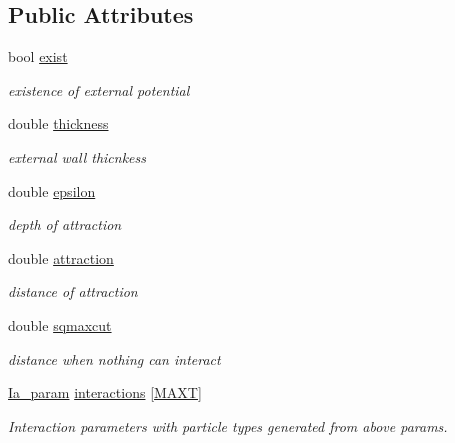 \subsection*{Public Attributes}
\begin{DoxyCompactItemize}
\item 
bool \hyperlink{class_exters_a78d759bd9da50ad5c4669dae9c6172ff}{exist}
\begin{DoxyCompactList}\small\item\em existence of external potential \end{DoxyCompactList}\item 
double \hyperlink{class_exters_a6ac0235fe365f41ca035957b748c9564}{thickness}
\begin{DoxyCompactList}\small\item\em external wall thicnkess \end{DoxyCompactList}\item 
double \hyperlink{class_exters_ac6920553910e27bde3188120889e8381}{epsilon}
\begin{DoxyCompactList}\small\item\em depth of attraction \end{DoxyCompactList}\item 
double \hyperlink{class_exters_a3ace0154ce9823eaafe3e7d7c0ae71bc}{attraction}
\begin{DoxyCompactList}\small\item\em distance of attraction \end{DoxyCompactList}\item 
double \hyperlink{class_exters_ae4e012e33e40f87ef88b08072bdf2d07}{sqmaxcut}
\begin{DoxyCompactList}\small\item\em distance when nothing can interact \end{DoxyCompactList}\item 
\hyperlink{class_ia__param}{Ia\+\_\+param} \hyperlink{class_exters_adecb24b99a4014cd45182172733493b7}{interactions} \mbox{[}\hyperlink{macros_8h_a3f79fdecc884eb98c97d1bdc77455295}{M\+A\+X\+T}\mbox{]}
\begin{DoxyCompactList}\small\item\em Interaction parameters with particle types generated from above params. \end{DoxyCompactList}\end{DoxyCompactItemize}


